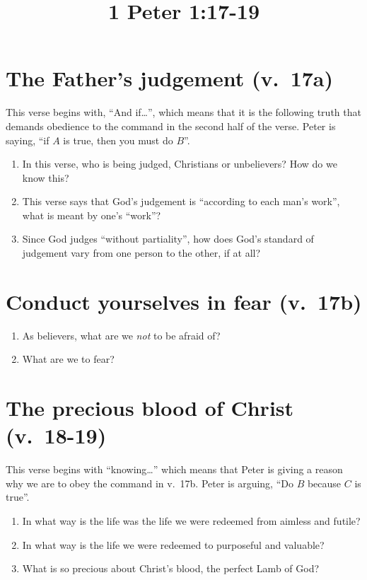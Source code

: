 \documentclass[12pt]{article}
\begin{document}
\title{1 Peter 1:17-19}
\section{The Father's judgement (v.~17a)}
This verse begins with, ``And if\ldots'',
    which means that it is the following truth that
    demands obedience to the command in the second half of the verse.
Peter is saying, ``if $A$ is true, then you must do $B$''.
\begin{enumerate}
\item In this verse, who is being judged, Christians or unbelievers? 
    How do we know this?
\item This verse says that God's judgement is ``according to each man's work'',
    what is meant by one's ``work''?
\item Since God judges ``without partiality'', 
    how does God's standard of judgement vary from one person to the other, 
    if at all?
\end{enumerate}

\section{Conduct yourselves in fear (v.~17b)}
\begin{enumerate}
\item As believers, what are we \emph{not} to be afraid of?
\item What are we to fear?
\end{enumerate}

\section{The precious blood of Christ (v.~18-19)}
This verse begins with ``knowing\ldots'' which means
    that Peter is giving a reason why we are to obey the command in v.~17b.
Peter is arguing, ``Do $B$ because $C$ is true''.
\begin{enumerate}
\item In what way is the life was the life we were redeemed from 
    aimless and futile?
\item In what way is the life we were redeemed to purposeful and valuable?
\item What is so precious about Christ's blood, the perfect Lamb of God?
\end{enumerate}
\end{document}
